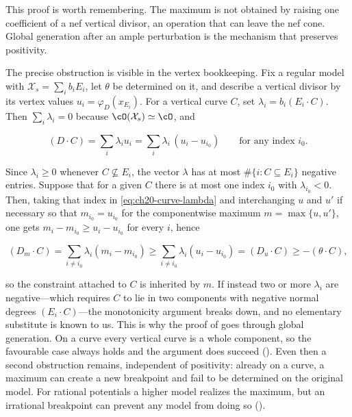 \begin{remark}
\label{rem:ch20-why-max-is-hard}
This proof is worth remembering.  The maximum is not obtained by raising
one coefficient of a nef vertical divisor, an operation that can leave the
nef cone.  Global generation after an ample perturbation is the mechanism
that preserves positivity.

The precise obstruction is visible in the vertex bookkeeping.  Fix a regular
model with $\mathcal X_s=\sum_ib_iE_i$, let $\theta$ be determined on
it, and describe a vertical divisor by its vertex values
$u_i=\varphi_D(x_{E_i})$.  For a vertical curve $C$, set
$\lambda_i=b_i(E_i\cdot C)$.  Then $\sum_i\lambda_i=0$ because
$\cO(\mathcal X_s)\simeq\cO$, and

\begin{equation}
\label{eq:ch20-curve-lambda}
 (D\cdot C)=\sum_i\lambda_iu_i
 =\sum_{i}\lambda_i\,(u_i-u_{i_0})
 \qquad\text{for any index }i_0 .
\end{equation}

Since $\lambda_i\geq0$ whenever $C\not\subseteq E_i$, the vector
$\lambda$ has at most $\#\{i:C\subseteq E_i\}$ negative entries.  Suppose
that for a given $C$ there is at most one index $i_0$ with
$\lambda_{i_0}<0$.  Then, taking that index in
\eqref{eq:ch20-curve-lambda} and interchanging $u$ and $u'$ if
necessary so that $m_{i_0}=u_{i_0}$ for the componentwise maximum
$m=\max\{u,u'\}$, one gets $m_i-m_{i_0}\geq u_i-u_{i_0}$ for every
$i$, hence

\[
 (D_m\cdot C)=\sum_{i\ne i_0}\lambda_i(m_i-m_{i_0})
 \geq\sum_{i\ne i_0}\lambda_i(u_i-u_{i_0})=(D_u\cdot C)
 \geq-(\theta\cdot C),
\]

so the constraint attached to $C$ is inherited by $m$.  If instead two or
more $\lambda_i$ are negative---which requires $C$ to lie in two
components with negative normal degrees $(E_i\cdot C)$---the
monotonicity argument breaks down, and no elementary substitute is known to
us.  This is why the proof of  goes through global
generation.  On a curve every vertical curve is a whole component, so the
favourable case always holds and the argument does succeed
().  Even then a second obstruction remains,
independent of positivity: already on a curve, a maximum can create a new
breakpoint and fail to be determined on the original model.  For rational
potentials a higher model realizes the maximum, but an irrational
breakpoint can prevent any model from doing so
().
\end{remark}

